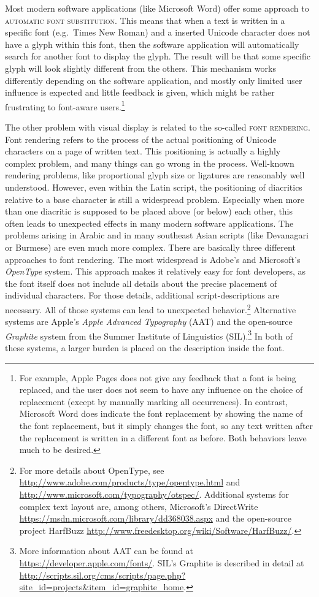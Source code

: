 Most modern software applications (like Microsoft Word) offer some approach to
\textsc{automatic font substitution}. This means that when a text is written in
a specific font (e.g.~Times New Roman) and a inserted Unicode character does not
have a glyph within this font, then the software application will automatically
search for another font to display the glyph. The result will be that some
specific glyph will look slightly different from the others. This mechanism
works differently depending on the software application, and mostly only limited
user influence is expected and little feedback is given, which might be rather
frustrating to font-aware users.\footnote{For example, Apple Pages does not give
any feedback that a font is being replaced, and the user does not seem to have
any influence on the choice of replacement (except by manually marking all
occurrences). In contrast, Microsoft Word does indicate the font replacement by
showing the name of the font replacement, but it simply changes the font, so any
text written after the replacement is written in a different font as before.
Both behaviors leave much to be desired.}

The other problem with visual display is related to the so-called \textsc{font
rendering}. Font rendering refers to the process of the actual positioning of
Unicode characters on a page of written text. This positioning is actually a
highly complex problem, and many things can go wrong in the process. Well-known
rendering problems, like proportional glyph size or ligatures are reasonably
well understood. However, even within the Latin script, the positioning of
diacritics relative to a base character is still a widespread problem.
Especially when more than one diacritic is supposed to be placed above (or
below) each other, this often leads to unexpected effects in many modern
software applications. The problems arising in Arabic and in many southeast
Asian scripts (like Devanagari or Burmese) are even much more complex. There are
basically three different approaches to font rendering. The most widespread is
Adobe's and Microsoft's \emph{OpenType }system. This approach makes it
relatively easy for font developers, as the font itself does not include all
details about the precise placement of individual characters. For those details,
additional script-descriptions are necessary. All of those systems can lead to
unexpected behavior.\footnote{For more details about OpenType, see
\url{http://www.adobe.com/products/type/opentype.html} and
\url{http://www.microsoft.com/typography/otspec/}. Additional systems for
complex text layout are, among others, Microsoft's DirectWrite
\url{https://msdn.microsoft.com/library/dd368038.aspx} and the open-source
project HarfBuzz \url{http://www.freedesktop.org/wiki/Software/HarfBuzz/}.}
Alternative systems are Apple's \emph{Apple Advanced Typography} (AAT) and the
open-source \emph{Graphite} system from the Summer Institute of Linguistics
(SIL).\footnote{More information about AAT can be found at
\url{https://developer.apple.com/fonts/}. SIL's Graphite is described in detail
at
\url{http://scripts.sil.org/cms/scripts/page.php?site\_id=projects\&item\_id=graphite\_home}.}
In both of these systems, a larger burden is placed on the description inside
the font.

